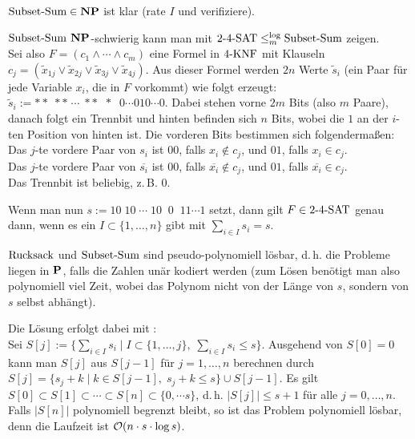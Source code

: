 \begin{Beweis}
    $\SubsetSum \in \NP$ ist klar (rate $I$ und verifiziere).

    $\SubsetSum$ $\NP$-schwierig kann man mit $\kSAT{2\text{-}4} \le_m^{\log} \SubsetSum$ zeigen.\\
    Sei also $F = (c_1 \land \dotsb \land c_m)$ eine Formel in $\kKNF{4}$ mit
    Klauseln $c_j = (\widetilde{x}_{1j} \lor \widetilde{x}_{2j} \lor
    \widetilde{x}_{3j} \lor \widetilde{x}_{4j})$.
    Aus dieser Formel werden $2n$ Werte $\widetilde{s}_i$
    (ein Paar für jede Variable $x_i$, die in $F$ vorkommt) wie folgt erzeugt:
    $\widetilde{s}_i := \ast\ast\; \ast\ast\; \dotsb\; \ast\ast\;\; \ast\;\;
    0 \dotsb 010 \dotsb 0$.
    Dabei stehen vorne $2m$ Bits (also $m$ Paare), danach folgt ein Trennbit und hinten befinden
    sich $n$ Bits, wobei die $1$ an der $i$-ten Position von hinten ist.
    Die vorderen Bits bestimmen sich folgendermaßen:\\
    Das $j$-te vordere Paar von $s_i$ ist $00$,
    falls $x_i \notin c_j$, und $01$, falls $x_i \in c_j$.\\
    Das $j$-te vordere Paar von $\overline{s_i}$ ist $00$,
    falls $\overline{x_i} \notin c_j$, und $01$, falls $\overline{x_i} \in c_j$.\\
    Das Trennbit ist beliebig, z.\,B. $0$.

    Wenn man nun $s := 10\; 10\; \dotsb\; 10\;\; 0\;\; 11 \dotsb 1$ setzt,
    dann gilt $F \in \kSAT{2\text{-}4}$ genau dann, wenn
    es ein $I \subset \{1, \dotsc, n\}$ gibt mit $\sum_{i \in I} s_i = s$.
\end{Beweis}

\linie

\begin{Bem}
    $\Rucksack$ und $\SubsetSum$ sind pseudo-polynomiell lösbar,
    d.\,h. die Probleme liegen in $\P$, falls die Zahlen unär kodiert werden
    (zum Lösen benötigt man also polynomiell viel Zeit,
    wobei das Polynom nicht von der Länge von $s$, sondern von $s$ selbst abhängt).

    Die Lösung erfolgt dabei mit :\\
    Sei $S[j] := \{\sum_{i \in I} s_i \;|\; I \subset \{1, \dotsc, j\},\;
    \sum_{i \in I} s_i \le s\}$.
    Ausgehend von $S[0] = 0$ kann man $S[j]$ aus $S[j-1]$ für $j = 1, \dotsc, n$ berechnen
    durch $S[j] = \{s_j + k \;|\; k \in S[j-1],\; s_j + k \le s\} \cup S[j-1]$.
    Es gilt $S[0] \subset S[1] \subset \dotsb \subset S[n] \subset \{0, \dotsb s\}$,
    d.\,h. $|S[j]| \le s + 1$ für alle $j = 0, \dotsc, n$.
    Falls $|S[n]|$ polynomiell begrenzt bleibt, so ist das Problem polynomiell lösbar,
    denn die Laufzeit ist $\O(n \cdot s \cdot \log s)$.
\end{Bem}

